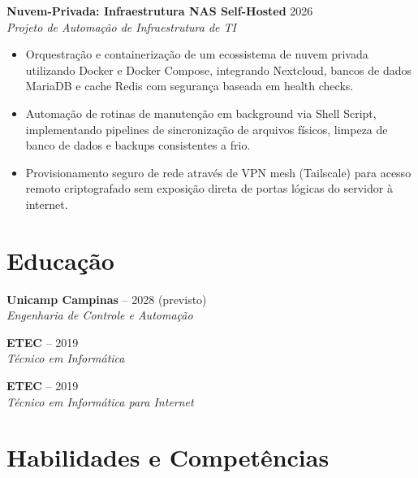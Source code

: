 \documentclass[a4paper,10pt]{article}
\newcommand{\entry}[4]{
  \noindent\textbf{#1} \hfill #2 \\
  \noindent\textit{#3} \hfill \textit{#4} \\
  \vspace{2pt}
}
\begin{document}
\entry{Nuvem-Privada: Infraestrutura NAS Self-Hosted}{2026}{Projeto de Automação de Infraestrutura de TI}{}
\vspace{-1.6em}
\begin{itemize}
\setlength\itemsep{0em}
\item Orquestração e containerização de um ecossistema de nuvem privada utilizando Docker e Docker Compose, integrando Nextcloud, bancos de dados MariaDB e cache Redis com segurança baseada em health checks.
\item Automação de rotinas de manutenção em background via Shell Script, implementando pipelines de sincronização de arquivos físicos, limpeza de banco de dados e backups consistentes a frio.
\item Provisionamento seguro de rede através de VPN mesh (Tailscale) para acesso remoto criptografado sem exposição direta de portas lógicas do servidor à internet.
\end{itemize}

\section*{Educação}

\entry{Unicamp Campinas}{\faCalendar {} -- 2028 (previsto)}{Engenharia de Controle e Automação}{}

\entry{ETEC}{\faCalendar {} -- 2019}{Técnico em Informática}{}

\entry{ETEC}{\faCalendar {} -- 2019}{Técnico em Informática para Internet}{}

\section*{Habilidades e Competências}
\end{document}
